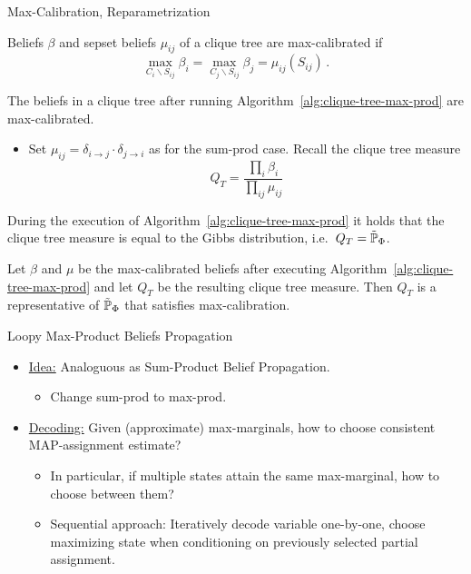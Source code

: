 \begin{frame}{Max-Calibration, Reparametrization}
    \begin{definition}
        Beliefs $\beta$ and sepset beliefs $\mu_{ij}$ of a clique tree are max-calibrated if
        \begin{equation}
            \max_{C_i \backslash S_{ij}} \beta_i = \max_{C_j \backslash S_{ij}} \beta_j = \mu_{ij}(S_{ij})\,.
        \end{equation}
    \end{definition}
    \pause
    \begin{proposition}
        The beliefs in a clique tree after running Algorithm~\ref{alg:clique-tree-max-prod} are max-calibrated.
    \end{proposition}
    \pause
    \begin{itemize}
        \item Set $\mu_{ij} = \delta_{i \rightarrow j} \cdot \delta_{j \rightarrow i}$ as for the sum-prod case. Recall the clique tree measure
        \begin{equation}
            Q_T = \frac{\prod_i \beta_i}{\prod_{ij} \mu_{ij}}
        \end{equation}
    \end{itemize}
    \pause
    \begin{proposition}[Reparametrization]
        During the execution of Algorithm~\ref{alg:clique-tree-max-prod} it holds that the clique tree measure is equal to the Gibbs distribution, i.e.\ $Q_T = \tilde{\Pb}_{\Phi}$.
    \end{proposition}
    \pause
    \begin{corollary}
       Let $\beta$ and $\mu$ be the max-calibrated beliefs after executing Algorithm~\ref{alg:clique-tree-max-prod} and let $Q_T$ be the resulting clique tree measure. Then $Q_T$ is a representative of $\tilde{\Pb}_{\Phi}$ that satisfies max-calibration.
    \end{corollary}
\end{frame}

\begin{frame}{Loopy Max-Product Beliefs Propagation}
\begin{itemize}
    \item \underline{Idea:} Analoguous as Sum-Product Belief Propagation.
    \begin{itemize}
        \pause \item Change sum-prod to max-prod.
    \end{itemize} 
    \pause \item \underline{Decoding:} Given (approximate) max-marginals, how to choose consistent MAP-assignment estimate?
    \begin{itemize}
        \pause \item In particular, if multiple states attain the same max-marginal, how to choose between them?
        \pause \item Sequential approach: Iteratively decode variable one-by-one, choose maximizing state when conditioning on previously selected partial assignment.
    \end{itemize}
\end{itemize}
\end{frame}


